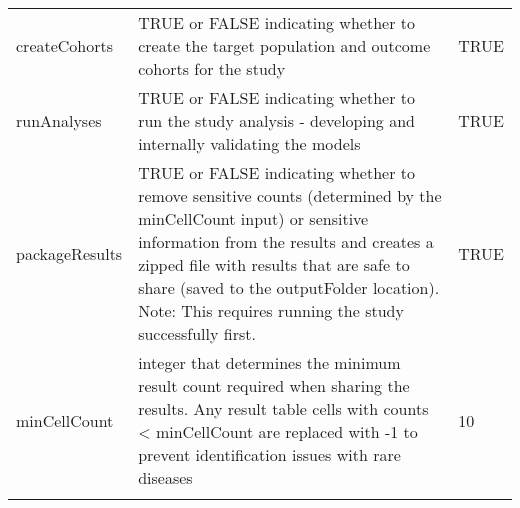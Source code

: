 \documentclass[
]{article}
\begin{document}
\begin{longtable}[]{@{}lll@{}}
\begin{minipage}[t]{0.21\columnwidth}
createCohorts\strut
\end{minipage} & \begin{minipage}[t]{0.46\columnwidth}\raggedright
TRUE or FALSE indicating whether to create the target population and
outcome cohorts for the study\strut
\end{minipage} & \begin{minipage}[t]{0.24\columnwidth}\raggedright
TRUE\strut
\end{minipage}\tabularnewline
\begin{minipage}[t]{0.21\columnwidth}\raggedright
runAnalyses\strut
\end{minipage} & \begin{minipage}[t]{0.46\columnwidth}\raggedright
TRUE or FALSE indicating whether to run the study analysis - developing
and internally validating the models\strut
\end{minipage} & \begin{minipage}[t]{0.24\columnwidth}\raggedright
TRUE\strut
\end{minipage}\tabularnewline
\begin{minipage}[t]{0.21\columnwidth}\raggedright
packageResults\strut
\end{minipage} & \begin{minipage}[t]{0.46\columnwidth}\raggedright
TRUE or FALSE indicating whether to remove sensitive counts (determined
by the minCellCount input) or sensitive information from the results and
creates a zipped file with results that are safe to share (saved to the
outputFolder location). Note: This requires running the study
successfully first.\strut
\end{minipage} & \begin{minipage}[t]{0.24\columnwidth}\raggedright
TRUE\strut
\end{minipage}\tabularnewline
\begin{minipage}[t]{0.21\columnwidth}\raggedright
minCellCount\strut
\end{minipage} & \begin{minipage}[t]{0.46\columnwidth}\raggedright
integer that determines the minimum result count required when sharing
the results. Any result table cells with counts \textless{} minCellCount
are replaced with -1 to prevent identification issues with rare
diseases\strut
\end{minipage} & \begin{minipage}[t]{0.24\columnwidth}\raggedright
10\strut
\end{minipage}\tabularnewline
\begin{minipage}[t]{0.21\columnwidth}\raggedright

\end{minipage}
\end{longtable}
\end{document}
